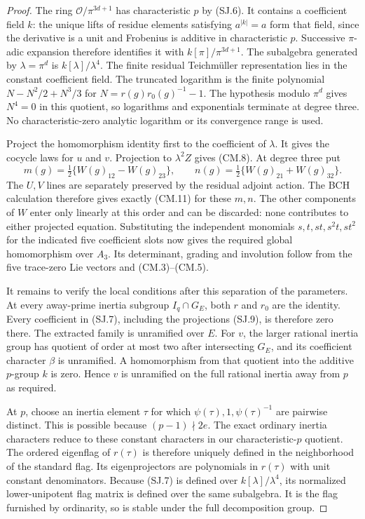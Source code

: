 \documentclass[11pt,a4paper]{article}
\theoremstyle{definition}
\begin{document}
\begin{proof}
The ring $\mathcal O/\pi^{3d+1}$ has characteristic $p$
by (SJ.6).  It contains a coefficient field $k$: the unique
lifts of residue elements satisfying $a^{|k|}=a$ form that
field, since the derivative is a unit and Frobenius is
additive in characteristic $p$.
Successive $\pi$-adic expansion therefore identifies it
with $k[\pi]/\pi^{3d+1}$.
The subalgebra generated by $\lambda=\pi^d$ is
$k[\lambda]/\lambda^4$.
The finite residual Teichm\"uller representation lies in
the constant coefficient field.
The truncated logarithm is the finite polynomial
$N-N^2/2+N^3/3$ for $N=r(g)r_0(g)^{-1}-1$.
The hypothesis modulo $\pi^d$ gives $N^4=0$ in this
quotient, so logarithms and exponentials terminate at
degree three.  No characteristic-zero analytic
logarithm or its convergence range is used.

Project the homomorphism identity first to the coefficient
of $\lambda$.  It gives the cocycle laws for $u$ and $v$.
Projection to $\lambda^2Z$ gives (CM.8).
At degree three put
\[
 m(g)=\tfrac12\{W(g)_{12}-W(g)_{23}\},\qquad
 n(g)=\tfrac12\{W(g)_{21}+W(g)_{32}\}.                  \tag{SJ.9}
\]
The $U,V$ lines are separately preserved by the residual
adjoint action.  The BCH calculation therefore gives
exactly (CM.11) for these $m,n$.
The other components of $W$ enter only linearly at this
order and can be discarded: none contributes to either
projected equation.  Substituting the independent monomials
$s,t,st,s^2t,st^2$ for the indicated five coefficient slots
now gives the required global homomorphism over $A_3$.
Its determinant, grading and involution follow from
the five trace-zero Lie vectors and (CM.3)--(CM.5).

It remains to verify the local conditions after this
separation of the parameters.
At every away-prime inertia subgroup $I_q\cap G_E$,
both $r$ and $r_0$ are the identity.  Every coefficient
in (SJ.7), including the projections (SJ.9), is therefore
zero there.  The extracted family is unramified over $E$.
For $v$, the larger rational inertia group has quotient
of order at most two after intersecting $G_E$, and its
coefficient character $\beta$ is unramified.
A homomorphism from that quotient into the additive
$p$-group $k$ is zero.  Hence $v$ is unramified on
the full rational inertia away from $p$ as required.

At $p$, choose an inertia element $\tau$ for which
$\psi(\tau),1,\psi(\tau)^{-1}$ are pairwise distinct.
This is possible because $(p-1)\nmid2e$.
The exact ordinary inertia characters reduce to these
constant characters in our characteristic-$p$ quotient.
The ordered eigenflag of $r(\tau)$ is therefore uniquely
defined in the neighborhood of the standard flag.
Its eigenprojectors are polynomials in $r(\tau)$ with
unit constant denominators.  Because (SJ.7) is defined
over $k[\lambda]/\lambda^4$, its normalized lower-unipotent
flag matrix is defined over the same subalgebra.
It is the flag furnished by ordinarity, so is stable
under the full decomposition group.


\end{proof}
\end{document}
